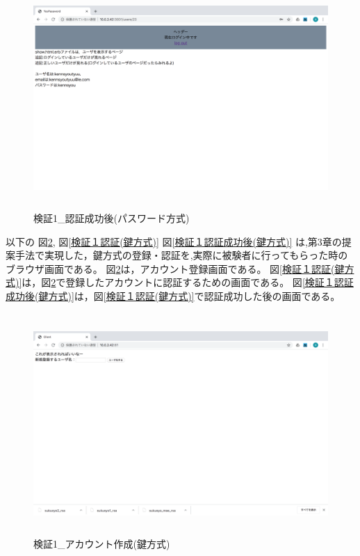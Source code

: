     \vspace{4cm}%
    \begin{figure}[H]
        \includegraphics[height=8.4cm]{./fig/chapter4/inspect_1/password_screnn/success.png}
        \caption{検証1\_認証成功後(パスワード方式)}
        \label{検証１認証成功後(パスワード方式)}
    \end{figure}








    \newpage
    \newpage

    以下の
    図\ref{検証１アカウント作成(鍵方式)},
    図\ref{検証１認証(鍵方式)}
    図\ref{検証１認証成功後(鍵方式)}
    は,第3章の提案手法で実現した，鍵方式の登録・認証を,実際に被験者に行ってもらった時のブラウザ画面である。
    図\ref{検証１アカウント作成(鍵方式)}は，アカウント登録画面である。
    図\ref{検証１認証(鍵方式)}は，図\ref{検証１アカウント作成(鍵方式)}で登録したアカウントに認証するための画面である。
    図\ref{検証１認証成功後(鍵方式)}は，図\ref{検証１認証(鍵方式)}で認証成功した後の画面である。
    \vspace{4cm}%
    \begin{figure}[H]
        \includegraphics[height=8.4cm]{./fig/chapter4/inspect_1/key_screnn/sign_up.png}
        \caption{検証1\_アカウント作成(鍵方式)}
        \label{検証１アカウント作成(鍵方式)}
    \end{figure}

